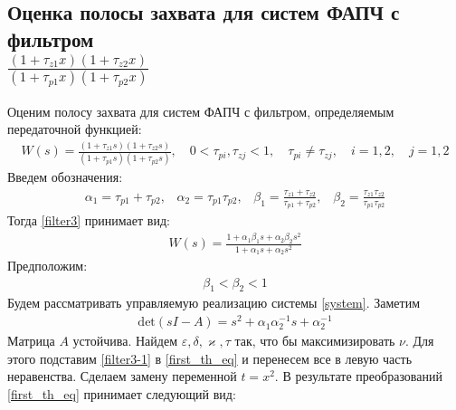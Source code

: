 \documentclass[a4paper,14pt]{article} %
\theoremstyle{cited}
\begin{document}
\pagebreak
\subsection{Оценка полосы захвата для систем ФАПЧ с фильтром \\ $\frac{(1+\tau_{z1}x)(1+\tau_{z2}x)}{(1+\tau_{p1}x)(1+\tau_{p2}x)}$}
Оценим полосу захвата для систем ФАПЧ с фильтром, определяемым передаточной функцией:
 \begin{equation}\label{filter3}
 \begin{aligned}
W(s) = \frac{(1+\tau_{z1}s)(1+\tau_{z2}s)}{(1+\tau_{p1}s)(1+\tau_{p2}s)}, \quad 0<\tau_{pi},\tau_{zj} < 1, \quad \tau_{pi} \neq \tau_{zj}, \quad i=1,2, \quad j=1,2
 \end{aligned}
\end{equation}
Введем обозначения:
 \begin{equation}
 \begin{aligned}
\alpha_1 = \tau_{p1} + \tau_{p2}\text{,}\quad 
\alpha_2 = \tau_{p1}\tau_{p2}\text{,}\quad 
\beta_1 = \frac{\tau_{z1}+\tau_{z2}}{\tau_{p1}+\tau_{p2}}\text{,}\quad 
\beta_2 = \frac{\tau_{z1}\tau_{z2}}{\tau_{p1}\tau_{p2}}
 \end{aligned}
\end{equation}
Тогда \eqref{filter3} принимает вид:
 \begin{equation}\label{filter3-1}
 \begin{aligned}
W(s) = \frac{1+\alpha_1\beta_1s + \alpha_2\beta_2s^2}{1+\alpha_1s + \alpha_2s^2}
 \end{aligned}
\end{equation}
Предположим:
 \begin{equation}\label{restriction-1}
 \begin{aligned}
\beta_1 < \beta_2 < 1
 \end{aligned}
\end{equation}
Будем рассматривать управляемую реализацию системы \eqref{system}. Заметим
 \begin{equation}
 \begin{aligned}
\text{det}(sI-A) = s^2 + \alpha_1\alpha_2^{-1}s + \alpha_2^{-1}
 \end{aligned}
\end{equation}
Матрица $A$ устойчива. Найдем $\varepsilon, \delta, \varkappa, \tau$ так, что бы максимизировать $\nu$. Для этого подставим \eqref{filter3-1} в \eqref{first_th_eq} и перенесем все в левую часть неравенства. Сделаем замену переменной $t = x^2$. В результате преобразований \eqref{first_th_eq} принимает следующий вид:
\end{document}
